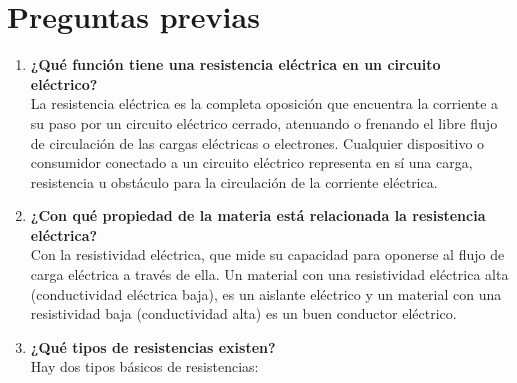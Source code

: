 \documentclass[letter,11pt]{article}
\begin{document}
\section{Preguntas previas}
\begin{enumerate}
\item \textbf{¿Qué función tiene una resistencia eléctrica en un circuito
eléctrico?} \\
La resistencia eléctrica es la completa oposición que encuentra la corriente a
su paso por un circuito eléctrico cerrado, atenuando o frenando el libre flujo
de circulación de las cargas eléctricas o electrones. Cualquier dispositivo o
consumidor conectado a un circuito eléctrico representa en sí una carga,
resistencia u obstáculo para la circulación de la corriente eléctrica.

\item \textbf{¿Con qué propiedad de la materia está relacionada la resistencia
eléctrica?} \\
Con la resistividad eléctrica, que mide su capacidad para oponerse al flujo de
carga eléctrica a través de ella. Un material con una resistividad eléctrica
alta (conductividad eléctrica baja), es un aislante eléctrico y un material con
una resistividad baja (conductividad alta) es un buen conductor eléctrico.

\item \textbf{¿Qué tipos de resistencias existen?} \\
Hay dos tipos básicos de resistencias:


\end{enumerate}
\end{document}
